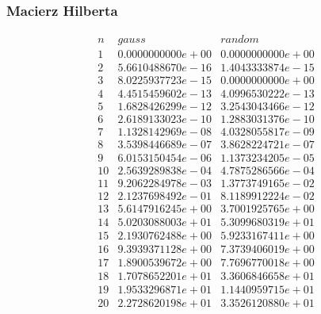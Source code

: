 \subsubsection*{Macierz Hilberta}
$$
\begin{array}{c|c|c}
n & gauss & random\\
\hline
1 & 0.0000000000e+00 & 0.0000000000e+00 \\
2 & 5.6610488670e-16 & 1.4043333874e-15 \\
3 & 8.0225937723e-15 & 0.0000000000e+00 \\
4 & 4.4515459602e-13 & 4.0996530222e-13 \\
5 & 1.6828426299e-12 & 3.2543043466e-12 \\
6 & 2.6189133023e-10 & 1.2883031376e-10 \\
7 & 1.1328142969e-08 & 4.0328055817e-09 \\
8 & 3.5398446689e-07 & 3.8628224721e-07 \\
9 & 6.0153150454e-06 & 1.1373234205e-05 \\
10 & 2.5639289838e-04 & 4.7875286566e-04 \\
11 & 9.2062284978e-03 & 1.3773749165e-02 \\
12 & 2.1237698492e-01 & 8.1189912224e-02 \\
13 & 5.6147916245e+00 & 3.7001925765e+00 \\
14 & 5.0203088003e+01 & 5.3099680319e+01 \\
15 & 2.1930762488e+00 & 5.9233167411e+00 \\
16 & 9.3939371128e+00 & 7.3739406019e+00 \\
17 & 1.8900539672e+00 & 7.7696770018e+00 \\
18 & 1.7078652201e+01 & 3.3606846658e+01 \\
19 & 1.9533296871e+01 & 1.1440959715e+01 \\
20 & 2.2728620198e+01 & 3.3526120880e+01 \\
\end{array}
$$
